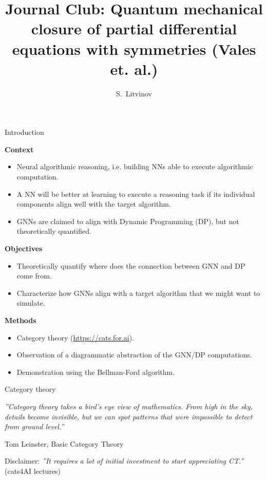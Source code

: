 \documentclass[10pt,aspectratio=169]{beamer}
\title[]{\Large Journal Club: Quantum mechanical closure of partial differential equations with symmetries (Vales et. al.)}
\author{\large S.~Litvinov}
\begin{document}
\begin{frame}
  \titlepage
\end{frame}
\begin{frame}{Introduction}

\textbf{Context}
\begin{itemize}
  \item Neural algorithmic reasoning, i.e. building NNs able to execute algorithmic computation.
  \item A NN will be better at learning to execute a reasoning task if its individual components align well with the target algorithm.
  \item GNNs are claimed to align with Dynamic Programming (DP), but not theoretically quantified.
\end{itemize}

\textbf{Objectives}
\begin{itemize}
  \item Theoretically quantify where does the connection between GNN and DP come from.
  \item Characterize how GNNs align with a target algorithm that we might want to simulate.
\end{itemize}

\textbf{Methods}
\begin{itemize}
  \item Category theory (\url{https://cats.for.ai}).
  \item Observation of a diagrammatic abstraction of the GNN/DP computations.
  \item Demonstration using the Bellman-Ford algorithm.
\end{itemize}

\end{frame}





\begin{frame}{Category theory}

\textit{''Category theory takes a bird's eye view of mathematics. From high in the sky, details become invisible, but we can spot patterns that were impossible to detect from ground level.''}

Tom Leinster, Basic Category Theory

\vspace{2ex}
Disclaimer: \textit{''It requires a lot of initial investment to start appreciating CT.''} (cats4AI lectures)


\end{frame}
\end{document}
